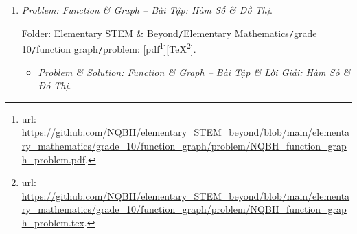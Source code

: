 \documentclass[12pt]{article}
\begin{document}
\begin{enumerate}
	Folder: {\sf Elementary STEM \& Beyond{\tt/}Elementary Mathematics{\tt/}grade 10{\tt/}linear system inequations{\tt/}problem}: [\href{https://github.com/NQBH/elementary_STEM_beyond/blob/main/elementary_mathematics/grade_10/linear_system_inequations/problem/NQBH_linear_system_inequations_problem.pdf}{pdf}\footnote{{\sc url}: \url{https://github.com/NQBH/elementary_STEM_beyond/blob/main/elementary_mathematics/grade_10/linear_system_inequations/problem/NQBH_linear_system_inequations_problem.pdf}.}][\href{https://github.com/NQBH/elementary_STEM_beyond/blob/main/elementary_mathematics/grade_10/linear_system_inequations/problem/NQBH_linear_system_inequations_problem.tex}{\TeX}\footnote{{\sc url}: \url{https://github.com/NQBH/elementary_STEM_beyond/blob/main/elementary_mathematics/grade_10/linear_system_inequations/problem/NQBH_linear_system_inequations_problem.tex}.}].
	\begin{itemize}
		\item {\it Problem \& Solution: Inequation \& Linear System of Inequations -- Bài Tập \& Lời Giải: Bất Phương Trình \& Hệ Bất Phương Trình}.
		
		Folder: {\sf Elementary STEM \& Beyond{\tt/}Elementary Mathematics{\tt/}grade 10{\tt/}linear system inequations{\tt/}solution}: [\href{https://github.com/NQBH/elementary_STEM_beyond/blob/main/elementary_mathematics/grade_10/linear_system_inequations/solution/NQBH_linear_system_inequations_solution.pdf}{pdf}\footnote{{\sc url}: \url{https://github.com/NQBH/elementary_STEM_beyond/blob/main/elementary_mathematics/grade_10/linear_system_inequations/solution/NQBH_linear_system_inequations_solution.pdf}.}][\href{https://github.com/NQBH/elementary_STEM_beyond/blob/main/elementary_mathematics/grade_10/linear_system_inequations/solution/NQBH_linear_system_inequations_solution.tex}{\TeX}\footnote{{\sc url}: \url{https://github.com/NQBH/elementary_STEM_beyond/blob/main/elementary_mathematics/grade_10/linear_system_inequations/solution/NQBH_linear_system_inequations_solution.tex}.}].
	\end{itemize}
	\item {\it Problem: Function \& Graph  -- Bài Tập: Hàm Số \& Đồ Thị}.
	
	Folder: {\sf Elementary STEM \& Beyond{\tt/}Elementary Mathematics{\tt/}grade 10{\tt/}function graph{\tt/}problem}: [\href{https://github.com/NQBH/elementary_STEM_beyond/blob/main/elementary_mathematics/grade_10/function_graph/problem/NQBH_function_graph_problem.pdf}{pdf}\footnote{{\sc url}: \url{https://github.com/NQBH/elementary_STEM_beyond/blob/main/elementary_mathematics/grade_10/function_graph/problem/NQBH_function_graph_problem.pdf}.}][\href{https://github.com/NQBH/elementary_STEM_beyond/blob/main/elementary_mathematics/grade_10/function_graph/problem/NQBH_function_graph_problem.tex}{\TeX}\footnote{{\sc url}: \url{https://github.com/NQBH/elementary_STEM_beyond/blob/main/elementary_mathematics/grade_10/function_graph/problem/NQBH_function_graph_problem.tex}.}].
	\begin{itemize}
		\item {\it Problem \& Solution: Function \& Graph  -- Bài Tập \& Lời Giải: Hàm Số \& Đồ Thị}.
		

\end{itemize}
\end{enumerate}
\end{document}

